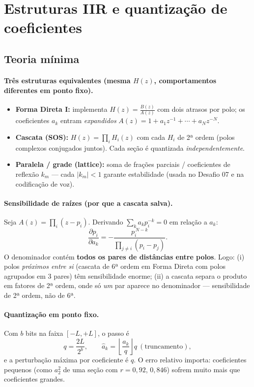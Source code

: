 \section{Estruturas IIR e quantização de coeficientes}\label{sec:estr}

\subsection*{Teoria mínima}

\paragraph{Três estruturas equivalentes (mesma $H(z)$, comportamentos
diferentes em ponto fixo).}
\begin{itemize}
  \item \textbf{Forma Direta I:} implementa
        $H(z)=\frac{B(z)}{A(z)}$ com dois atrasos por polo; os coeficientes
        $a_k$ entram \emph{expandidos}
        $A(z)=1+a_1z^{-1}+\cdots+a_Nz^{-N}$.
  \item \textbf{Cascata (SOS):} $H(z)=\prod_i H_i(z)$ com cada $H_i$ de 2ª
        ordem (polos complexos conjugados juntos). Cada seção é quantizada
        \emph{independentemente}.
  \item \textbf{Paralela / grade (lattice):} soma de frações parciais /
        coeficientes de reflexão $k_m$ — cada $|k_m|<1$ garante estabilidade
        (usada no Desafio 07 e na codificação de voz).
\end{itemize}

\paragraph{Sensibilidade de raízes (por que a cascata salva).} Seja
$A(z)=\prod_i(z-p_i)$. Derivando $\sum_k a_kp_i^{-k}=0$ em relação a $a_k$:
\[
  \frac{\partial p_i}{\partial a_k}
  =-\frac{p_i^{\,N-k}}{\prod_{j\neq i}(p_i-p_j)} .
\]
O denominador contém \textbf{todos os pares de distâncias entre polos}. Logo:
(i) polos \emph{próximos entre si} (cascata de 6ª ordem em Forma Direta com
polos agrupados em 3 pares) têm sensibilidade enorme; (ii) a cascata separa o
produto em fatores de 2ª ordem, onde só \emph{um} par aparece no denominador —
sensibilidade de 2ª ordem, não de 6ª.

\paragraph{Quantização em ponto fixo.} Com $b$ bits na faixa
$[-L,+L]$, o passo é
\[
  q=\frac{2L}{2^{b}},\qquad
  \hat{a}_k=\left\lfloor\frac{a_k}{q}\right\rfloor q\ (\text{truncamento}),
\]
e a perturbação máxima por coeficiente é $q$. O erro relativo importa:
coeficientes pequenos (como $a_2^{2}$ de uma seção com $r=0{,}92$,
$0{,}846$) sofrem muito mais que coeficientes grandes.

